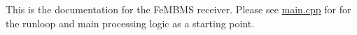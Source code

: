 This is the documentation for the Fe\+M\+B\+MS receiver. Please see \mbox{\hyperlink{main_8cpp}{main.\+cpp}} for for the runloop and main processing logic as a starting point. 